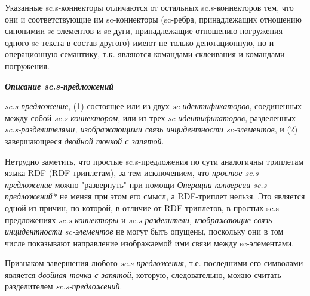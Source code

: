 Указанные sc.s-коннекторы отличаются от остальных sc.s-коннекторов тем, что они и соответствующие им sc-коннекторы (sc-ребра, принадлежащих отношению синонимии sc-элементов и sc-дуги, принадлежащие отношению погружения одного sc-текста в состав другого) имеют не только денотационную, но и операционную семантику, т.к. являются командами склеивания и командами погружения.

\bigskip
\textbf{\textit{Описание sc.s-предложений}}

\begin{SCn}
\end{SCn}

\textit{sc.s-предложение}, (1) \uline{состоящее} или из двух \textit{sc-идентификаторов}, соединенных между собой \textit{\mbox{sc.s-коннектором}}, или из трех \textit{sc-идентификаторов}, разделенных \textit{sc.s-разделителями, изображающими связь инцидентности sc-элементов}, и (2) завершающееся \textit{двойной точкой с запятой}.

Нетрудно заметить, что простые sc.s-предложения по сути аналогичны триплетам языка RDF (\mbox{RDF-триплетам}), за тем исключением, что \textit{простое sc.s-предложение} можно "развернуть"{} при помощи \textit{Операции конверсии sc.s-предложений*} не меняя при этом его смысл, а RDF-триплет нельзя. Это является одной из причин, по которой, в отличие от RDF-триплетов, в простых \mbox{sc.s-предложениях} \textit{\mbox{sc.s-коннекторы}} и \textit{\mbox{sc.s-разделители}, изображающие связь инцидентности \mbox{sc-элементов}} не могут быть опущены, поскольку они в том числе показывают направление изображаемой ими связи между sc-элементами.

Признаком завершения любого \textit{sc.s-предложения}, т.е. последними его символами является \textit{двойная точка с запятой}, которую, следовательно, можно считать разделителем \textit{sc.s-предложений}.


